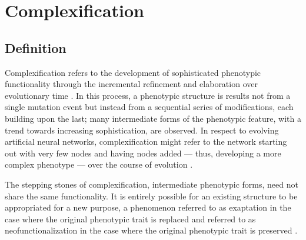    
\section{Complexification} \label{sec:complexification}
\subsection{Definition}
Complexification refers to the development of sophisticated phenotypic functionality through the incremental refinement and elaboration over evolutionary time \cite[pg 202]{Downing2015IntelligenceSystems}. In this process, a phenotypic structure is results not from a single mutation event but instead from a sequential series of modifications, each building upon the last; many intermediate forms of the phenotypic feature, with a trend towards increasing sophistication, are observed. In respect to evolving artificial neural networks, complexification might refer to the network starting out with very few nodes and having nodes added --- thus, developing a more complex phenotype ---  over the course of evolution \cite{Clune2011OnRegularity}.

The stepping stones of complexification, intermediate phenotypic forms, need not share the same functionality. It is entirely possible for an existing structure to be appropriated for a new purpose, a phenomenon referred to as exaptation \cite{Gould1982Exaptation-aForm} in the case where the original phenotypic trait is replaced and referred to as neofunctionalization in the case where the original phenotypic trait is preserved \cite{Escriva2006NeofunctionalizationReceptors}.  

